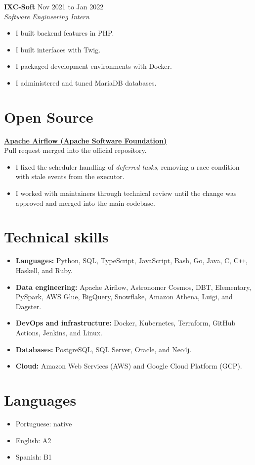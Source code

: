 \documentclass[a4paper,10pt]{article}
\begin{document}
\textbf{IXC-Soft} \hfill Nov 2021 to Jan 2022 \\
\textit{Software Engineering Intern}
\begin{itemize}
    \item I built backend features in PHP.
    \item I built interfaces with Twig.
    \item I packaged development environments with Docker.
    \item I administered and tuned MariaDB databases.
\end{itemize}

\section*{Open Source}

\textbf{\href{https://github.com/apache/airflow/pull/66431}{Apache Airflow (Apache Software Foundation)}} \\
Pull request merged into the official repository.
\begin{itemize}
    \item I fixed the scheduler handling of \textit{deferred tasks}, removing a race condition with stale events from the executor.
    \item I worked with maintainers through technical review until the change was approved and merged into the main codebase.
\end{itemize}

\section*{Technical skills}

\begin{itemize}
    \item \textbf{Languages:} Python, SQL, TypeScript, JavaScript, Bash, Go, Java, C, C\texttt{++}, Haskell, and Ruby.
    \item \textbf{Data engineering:} Apache Airflow, Astronomer Cosmos, DBT, Elementary, PySpark, AWS Glue, BigQuery, Snowflake, Amazon Athena, Luigi, and Dagster.
    \item \textbf{DevOps and infrastructure:} Docker, Kubernetes, Terraform, GitHub Actions, Jenkins, and Linux.
    \item \textbf{Databases:} PostgreSQL, SQL Server, Oracle, and Neo4j.
    \item \textbf{Cloud:} Amazon Web Services (AWS) and Google Cloud Platform (GCP).
\end{itemize}

\section*{Languages}

\begin{itemize}
    \item Portuguese: native
    \item English: A2
    \item Spanish: B1
\end{itemize}
\end{document}
